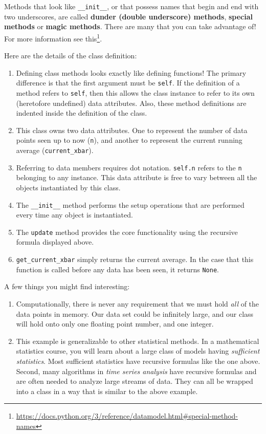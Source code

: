 \documentclass[
  12pt,
  krantz2]{krantz}
\renewcommand{\href}[2]{#2\footnote{\url{#1}}}
\newenvironment{rmd-details}{\begin{lrbox}{\rmdbox}
  \minipage[c]{\dimexpr \textwidth-2\fboxrule-\wd\bulb-\columnsep}
    \vspace*{\columnsep}}%
{\vspace*{\columnsep}\endminipage\end{lrbox}%
  {\par\color{green}\fboxsep=0pt
    \fbox{\usebox\bulb\usebox\rmdbox\hspace{\columnsep}}\par}}
\begin{document}
\begin{rmd-details}
Methods that look like \texttt{\_\_init\_\_}, or that possess names that begin and end with two underscores, are called \textbf{dunder (double underscore) methods}, \textbf{special methods} or \textbf{magic methods}. There are many that you can take advantage of! For more information see \href{https://docs.python.org/3/reference/datamodel.html\#special-method-names}{this}.

\end{rmd-details}

Here are the details of the class definition:

\begin{enumerate}
\def\labelenumi{\arabic{enumi}.}
\item
  Defining class methods looks exactly like defining functions! The primary difference is that the first argument must be \texttt{self}. If the definition of a method refers to \texttt{self}, then this allows the class instance to refer to its own (heretofore undefined) data attributes. Also, these method definitions are indented inside the definition of the class.
\item
  This class owns two data attributes. One to represent the number of data points seen up to now (\texttt{n}), and another to represent the current running average (\texttt{current\_xbar}).
\item
  Referring to data members requires dot notation. \texttt{self.n} refers to the \texttt{n} belonging to any instance. This data attribute is free to vary between all the objects instantiated by this class.
\item
  The \texttt{\_\_init\_\_} method performs the setup operations that are performed every time any object is instantiated.
\item
  The \texttt{update} method provides the core functionality using the recursive formula displayed above.
\item
  \texttt{get\_current\_xbar} simply returns the current average. In the case that this function is called before any data has been seen, it returns \texttt{None}.
\end{enumerate}

A few things you might find interesting:

\begin{enumerate}
\def\labelenumi{\roman{enumi}.}
\item
  Computationally, there is never any requirement that we must hold \emph{all} of the data points in memory. Our data set could be infinitely large, and our class will hold onto only one floating point number, and one integer.
\item
  This example is generalizable to other statistical methods. In a mathematical statistics course, you will learn about a large class of models having \emph{sufficient statistics}. Most sufficient statistics have recursive formulas like the one above. Second, many algorithms in \emph{time series analysis} have recursive formulas and are often needed to analyze large streams of data. They can all be wrapped into a class in a way that is similar to the above example.
\end{enumerate}
\end{document}
